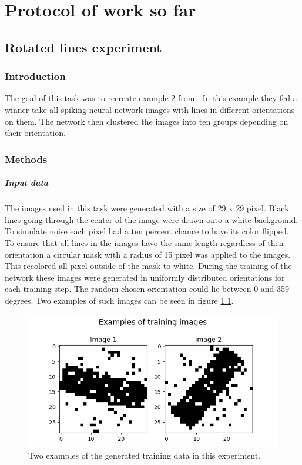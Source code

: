 \chapter{Protocol of work so far}
\section{Rotated lines experiment}

\subsection{Introduction}
The goal of this task was to recreate example 2 from \citet{nessler}. In this example they fed a winner-take-all spiking neural network images with lines in different orientations on them. The network then clustered the images into ten groups depending on their orientation.

\subsection{Methods}
\paragraph{Input data}
The images used in this task were generated with a size of 29 x 29 pixel. Black lines going through the center of the image were drawn onto a white background. To simulate noise each pixel had a ten percent chance to have its color flipped. To ensure that all lines in the images have the same length regardless of their orientation a circular mask with a radius of 15 pixel was applied to the images. This recolored all pixel outside of the mask to white. During the training of the network these images were generated in uniformly distributed orientations for each training step. The random chosen orientation could lie between 0 and 359 degrees.  Two examples of such images can be seen in figure \ref{fig:angleImages}.

\begin{figure}
  \includegraphics[width=\linewidth]{figures/angleNetwork/trainingImages.png}
  \caption{Two examples of the generated training data in this experiment.}
  \label{fig:angleImages}
\end{figure}

